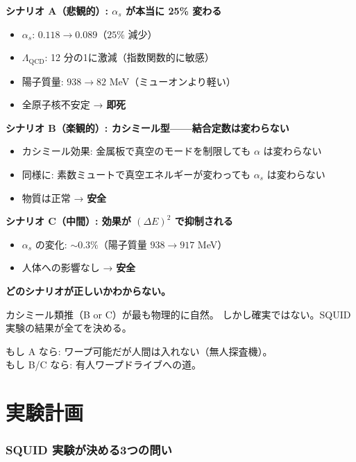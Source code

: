 \documentclass[12pt,a4paper]{article}
\begin{document}
\begin{dangerbox}[3つのシナリオ]

\textbf{シナリオ A（悲観的）: $\alpha_s$ が本当に 25\% 変わる}
\begin{itemize}
\item $\alpha_s$: $0.118 \to 0.089$（$25\%$ 減少）
\item $\Lambda_\mathrm{QCD}$: 12 分の1に激減（指数関数的に敏感）
\item 陽子質量: $938 \to 82$ MeV（ミューオンより軽い）
\item 全原子核不安定 → \textbf{即死}
\end{itemize}

\textbf{シナリオ B（楽観的）: カシミール型——結合定数は変わらない}
\begin{itemize}
\item カシミール効果: 金属板で真空のモードを制限しても $\alpha$ は変わらない
\item 同様に: 素数ミュートで真空エネルギーが変わっても $\alpha_s$ は変わらない
\item 物質は正常 → \textbf{安全}
\end{itemize}

\textbf{シナリオ C（中間）: 効果が $(\Delta E)^2$ で抑制される}
\begin{itemize}
\item $\alpha_s$ の変化: $\sim 0.3\%$（陽子質量 $938 \to 917$ MeV）
\item 人体への影響なし → \textbf{安全}
\end{itemize}
\end{dangerbox}

\begin{honestbox}[正直に]
\textbf{どのシナリオが正しいかわからない。}

カシミール類推（B or C）が最も物理的に自然。
しかし確実ではない。SQUID 実験の結果が全てを決める。

もし A なら: ワープ可能だが人間は入れない（無人探査機）。\\
もし B/C なら: 有人ワープドライブへの道。
\end{honestbox}

\part{実験計画}

\section{SQUID 実験が決める3つの問い}
\end{document}
